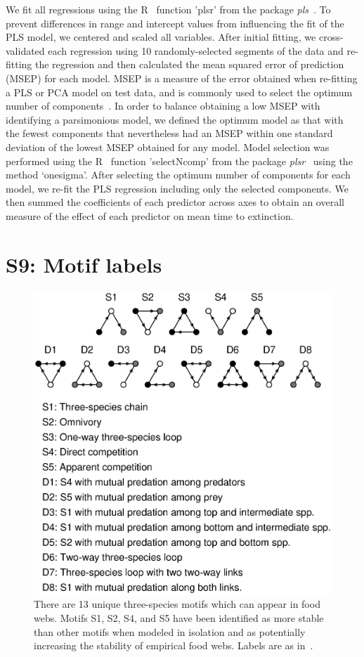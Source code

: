 \documentclass[12pt]{article}
\begin{document}
\begin{spacing}{2.0}
	
	We fit all regressions using the R~\citep{R} function 'plsr' from the package \emph{pls}~\citep{pls}.
	To prevent differences in range and intercept values from influencing the fit of the PLS model, we centered and scaled all variables.
	After initial fitting, we cross-validated each regression using 10 randomly-selected segments of the data and re-fitting the regression and then calculated the mean squared error of prediction (MSEP) for each model.
	MSEP is a measure of the error obtained when re-fitting a PLS or PCA model on test data, and is commonly used to select the optimum number of components~\citep{Mevik2004}.
	In order to balance obtaining a low MSEP with identifying a parsimonious model, we defined the optimum model as that with the fewest components that nevertheless had an MSEP within one standard deviation of the lowest MSEP obtained for any model.
	Model selection was performed using the R~\citep{R} function 'selectNcomp' from the package \emph{plsr}~\citep{pls} using the method `onesigma'.
	After selecting the optimum number of components for each model, we re-fit the PLS regression including only the selected components. 
	We then summed the coefficients of each predictor across axes to obtain an overall measure of the effect of each predictor on mean time to extinction.

\clearpage


\section*{S9: Motif labels}

	\begin{figure}[h!]
		\caption{There are 13 unique three-species motifs which can appear in food webs. Motifs S1, S2, S4, and S5 have been identified as more stable than other motifs when modeled in isolation and as potentially increasing the stability of empirical food webs. Labels are as in~\citet{Stouffer2007}.}
		\label{motifs}
		\includegraphics[width=.8\textwidth]{figures/motifs.eps}
		\end{figure}

\end{spacing}
\clearpage

     
\end{document}
